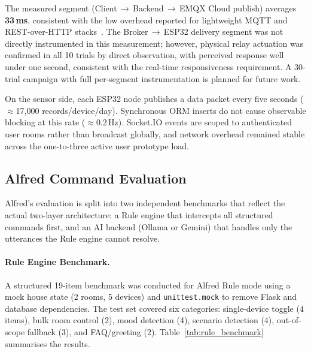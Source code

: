 The measured segment (Client\,$\to$\,Backend\,$\to$\,EMQX Cloud publish) averages \textbf{33\,ms}, consistent with the low overhead reported for lightweight MQTT and REST-over-HTTP stacks~\cite{Hunkeler2008,Collina2012,Singh2015}. The Broker\,$\to$\,ESP32 delivery segment was not directly instrumented in this measurement; however, physical relay actuation was confirmed in all 10 trials by direct observation, with perceived response well under one second, consistent with the real-time responsiveness requirement. A 30-trial campaign with full per-segment instrumentation is planned for future work.

On the sensor side, each ESP32 node publishes a data packet every five seconds ($\approx$17,000 records/device/day). Synchronous ORM inserts do not cause observable blocking at this rate ($\approx$0.2\,Hz). Socket.IO events are scoped to authenticated user rooms rather than broadcast globally, and network overhead remained stable across the one-to-three active user prototype load.

\subsection{Alfred Command Evaluation}
\label{subsec:alfred_benchmark}

Alfred's evaluation is split into two independent benchmarks that reflect the actual two-layer architecture: a Rule engine that intercepts all structured commands first, and an AI backend (Ollama or Gemini) that handles only the utterances the Rule engine cannot resolve.

\paragraph{Rule Engine Benchmark.}

A structured 19-item benchmark was conducted for Alfred Rule mode using a mock house state (2 rooms, 5 devices) and \texttt{unittest.mock} to remove Flask and database dependencies. The test set covered six categories: single-device toggle (4 items), bulk room control (2), mood detection (4), scenario detection (4), out-of-scope fallback (3), and FAQ/greeting (2). Table~\ref{tab:rule_benchmark} summarises the results.

